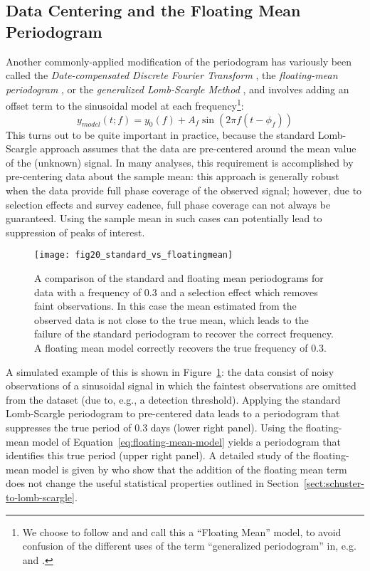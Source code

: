 \documentclass[preprint]{aastex}
\newcommand{\Fig}[1]{Figure~\ref{fig:#1}}
\newcommand{\figlabel}[1]{\label{fig:#1}}
\newcommand{\Eq}[1]{Equation~\ref{eq:#1}}
\newcommand{\eq}[1]{\Eq{#1}}
\newcommand{\eqlabel}[1]{\label{eq:#1}}
\newcommand{\Sect}[1]{Section~\ref{sect:#1}}
\newcommand{\sect}[1]{\Sect{#1}}
\newcommand{\sectlabel}[1]{\label{sect:#1}}
\begin{document}
\subsection{Data Centering and the Floating Mean Periodogram}
\sectlabel{floating-mean}

Another commonly-applied modification of the periodogram has variously been
called the
{\it Date-compensated Discrete Fourier Transform} \citep{Ferraz-Mello81},
the {\it floating-mean periodogram} \citep{Cumming99,VanderPlas2015},
or the {\it generalized Lomb-Scargle Method} \citep{Zechmeister09},
and involves adding an offset term to the sinusoidal model at each
frequency\footnote{We choose to follow \citet{Cumming99} and
  \citet{VanderPlas2015} and call this a ``Floating Mean'' model,
  to avoid confusion of the different uses of the term
  ``generalized periodogram'' in, {e.g.} \citet{Bretthorst2001} and
  \citet{Zechmeister09}.
}:
\begin{equation}
  y_{model}(t;f) = y_0(f) + A_f \sin(2 \pi f (t - \phi_f))
  \eqlabel{floating-mean-model}
\end{equation}
This turns out to be quite important in practice, because the standard
Lomb-Scargle approach assumes that the
data are pre-centered around the mean value of the (unknown) signal.
In many analyses, this requirement is accomplished by pre-centering data
about the sample mean: this approach is generally robust when
the data provide full phase coverage of the observed signal;
however, due to selection effects and survey cadence, full phase
coverage can not always be guaranteed.
Using the sample mean in such cases can potentially lead to suppression of
peaks of interest.

\begin{figure}[ht]
  \centering
  \texttt{[image: fig20\_standard\_vs\_floatingmean]}
  \caption{A comparison of the standard and floating mean periodograms for
    data with a frequency of 0.3 and a selection effect which removes
    faint observations.
    In this case the mean estimated from the observed data is not close to
    the true mean, which leads to the failure of the standard periodogram to
    recover the correct frequency. A floating mean model correctly recovers
    the true frequency of 0.3.
    \figlabel{standard-vs-floatingmean}}
\end{figure}

A simulated example of this is shown in \Fig{standard-vs-floatingmean}: the data
consist of noisy observations of a sinusoidal signal in which the faintest
observations are omitted from the dataset (due to, e.g., a detection threshold).
Applying the standard Lomb-Scargle periodogram to pre-centered data leads to a
periodogram that suppresses the true period of 0.3 days (lower right panel).
Using the floating-mean model of \eq{floating-mean-model} yields a periodogram
that identifies this true period (upper right panel).
A detailed study of the floating-mean model is given by
\citet{Zechmeister09} who show that the addition of the floating mean term
does not change the useful statistical properties outlined in \sect{schuster-to-lomb-scargle}.
\end{document}
